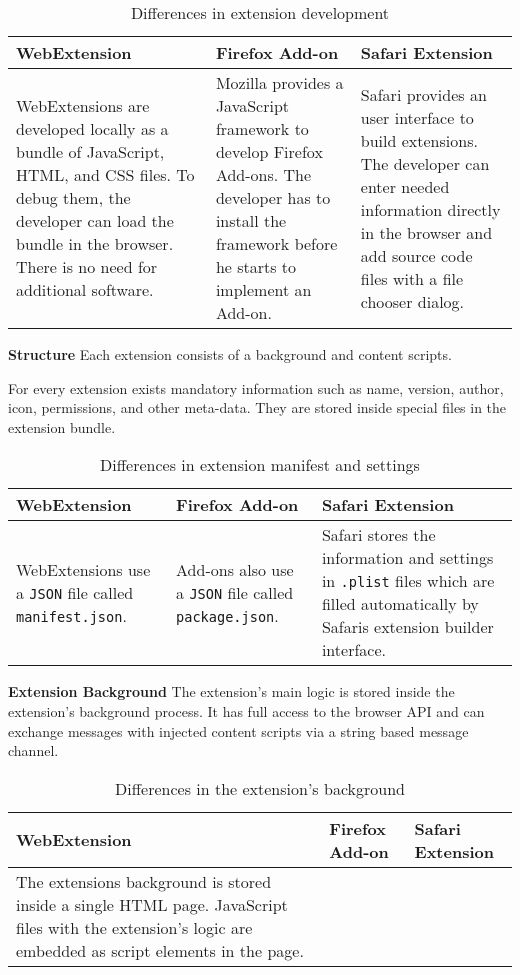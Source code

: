 	\begin{table}[h]
		\begin{tabular}{|p{}|p{}|p{}|}\hline
			\textbf{WebExtension} & \textbf{Firefox Add-on} & \textbf{Safari Extension} \\ \hline
			WebExtensions are developed locally as a bundle of JavaScript, HTML, and CSS files. To debug them, the developer can load the bundle in the browser. There is no need for additional software. & 
			Mozilla provides a JavaScript framework to develop Firefox Add-ons. The developer has to install the framework before he starts to implement an Add-on. & 
			Safari provides an user interface to build extensions. The developer can enter needed information directly in the browser and add source code files with a file chooser dialog. \\ \hline
		\end{tabular}
		\caption{Differences in extension development}	
	\end{table}

	\textbf{Structure} Each extension consists of a background and content scripts.
	
	
	For every extension exists mandatory information such as name, version, author, icon, permissions, and other meta-data. They are stored inside special files in the extension bundle. 
	
	\begin{table}[h]
		\begin{tabular}{|p{}|p{}|p{}|}\hline
				\textbf{WebExtension} & \textbf{Firefox Add-on} & \textbf{Safari Extension} \\ \hline
				WebExtensions use a \texttt{JSON} file called \texttt{manifest.json}. & 
				Add-ons also use a \texttt{JSON} file called \texttt{package.json}. & 
				Safari stores the information and settings in \texttt{.plist} files which are filled automatically by Safaris extension builder interface. \\ \hline
			\end{tabular}
		\caption{Differences in extension manifest and settings}
	\end{table}

	\textbf{Extension Background} The extension's main logic is stored inside the extension's background process. It has full access to the browser API and can exchange messages with injected content scripts via a string based message channel.
	
	\begin{table}[h]
		\begin{tabular}{|p{}|p{}|p{}|}\hline
			\textbf{WebExtension} & \textbf{Firefox Add-on} & \textbf{Safari Extension} \\ \hline
			The extensions background is stored inside a single HTML page. JavaScript files with the extension's logic are embedded as script elements in the page.  & 
			& 
			\\ \hline 
		\end{tabular}
		\caption{Differences in the extension's background}
	\end{table}
	
